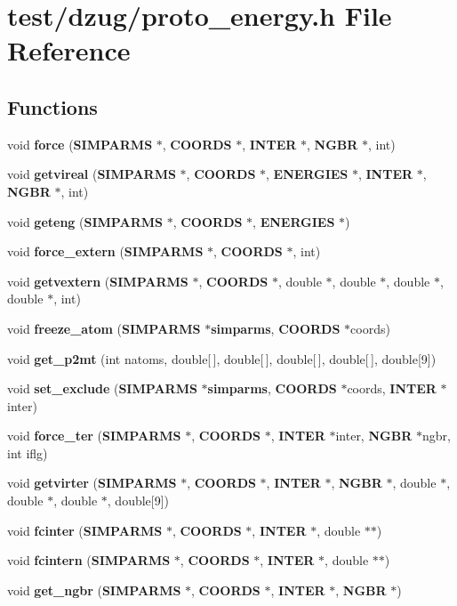 \section{test/dzug/proto\_\-energy.h File Reference}
\label{test_2dzug_2proto__energy_8h}
\subsection*{Functions}
\begin{CompactItemize}
\item 
void {\bf force} ({\bf SIMPARMS} $\ast$, {\bf COORDS} $\ast$, {\bf INTER} $\ast$, {\bf NGBR} $\ast$, int)
\item 
void {\bf getvireal} ({\bf SIMPARMS} $\ast$, {\bf COORDS} $\ast$, {\bf ENERGIES} $\ast$, {\bf INTER} $\ast$, {\bf NGBR} $\ast$, int)
\item 
void {\bf geteng} ({\bf SIMPARMS} $\ast$, {\bf COORDS} $\ast$, {\bf ENERGIES} $\ast$)
\item 
void {\bf force\_\-extern} ({\bf SIMPARMS} $\ast$, {\bf COORDS} $\ast$, int)
\item 
void {\bf getvextern} ({\bf SIMPARMS} $\ast$, {\bf COORDS} $\ast$, double $\ast$, double $\ast$, double $\ast$, double $\ast$, int)
\item 
void {\bf freeze\_\-atom} ({\bf SIMPARMS} $\ast${\bf simparms}, {\bf COORDS} $\ast$coords)
\item 
void {\bf get\_\-p2mt} (int natoms, double[$\,$], double[$\,$], double[$\,$], double[$\,$], double[9])
\item 
void {\bf set\_\-exclude} ({\bf SIMPARMS} $\ast${\bf simparms}, {\bf COORDS} $\ast$coords, {\bf INTER} $\ast$inter)
\item 
void {\bf force\_\-ter} ({\bf SIMPARMS} $\ast$, {\bf COORDS} $\ast$, {\bf INTER} $\ast$inter, {\bf NGBR} $\ast$ngbr, int iflg)
\item 
void {\bf getvirter} ({\bf SIMPARMS} $\ast$, {\bf COORDS} $\ast$, {\bf INTER} $\ast$, {\bf NGBR} $\ast$, double $\ast$, double $\ast$, double $\ast$, double[9])
\item 
void {\bf fcinter} ({\bf SIMPARMS} $\ast$, {\bf COORDS} $\ast$, {\bf INTER} $\ast$, double $\ast$$\ast$)
\item 
void {\bf fcintern} ({\bf SIMPARMS} $\ast$, {\bf COORDS} $\ast$, {\bf INTER} $\ast$, double $\ast$$\ast$)
\item 
void {\bf get\_\-ngbr} ({\bf SIMPARMS} $\ast$, {\bf COORDS} $\ast$, {\bf INTER} $\ast$, {\bf NGBR} $\ast$)

\end{CompactItemize}
